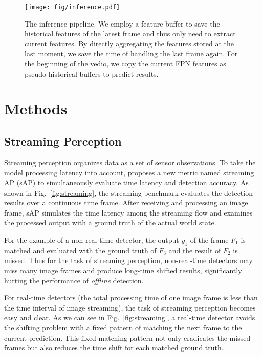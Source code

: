 \documentclass[10pt,twocolumn,letterpaper]{article}
\begin{document}
\begin{figure}[b]
\begin{center}
\texttt{[image: fig/inference.pdf]}
\caption{The inference pipeline. We employ a feature buffer to save the historical features of the latest frame and thus only need to extract current features. By directly aggregating the features stored at the last moment, we save the time of handling the last frame again. For the beginning of the vedio, we copy the current FPN features as pseudo historical buffers to predict results.}
\label{fig:inference}
\end{center}
\end{figure}


\section{Methods}

\subsection{Streaming Perception}
Streaming perception organizes data as a set of sensor observations. To take the model processing latency into account, \cite{streamer} proposes a new metric named streaming AP (sAP) to simultaneously evaluate time latency and detection accuracy. As shown in Fig.~\ref{fig:streaming}, the streaming benchmark evaluates the detection results over a continuous time frame. After receiving and processing an image frame, sAP simulates the time latency among the streaming flow and examines the processed output with a ground truth of the actual world state.

For the example of a non-real-time detector, the output $y_1$ of the frame $F_1$ is matched and evaluated with the ground truth of $F_3$ and the result of $F_2$ is missed. Thus for the task of streaming perception, non-real-time detectors may miss many image frames and produce long-time shifted results, significantly hurting the performance of \emph{offline} detection.   

For real-time detectors (the total processing time of one image frame is less than the time interval of image streaming), the task of streaming perception becomes easy and clear. 
As we can see in Fig.~\ref{fig:streaming}, a real-time detector avoids the shifting problem with a fixed pattern of matching the next frame to the current prediction.
This fixed matching pattern not only eradicates the missed frames but also reduces the time shift for each matched ground truth. 
\end{document}
